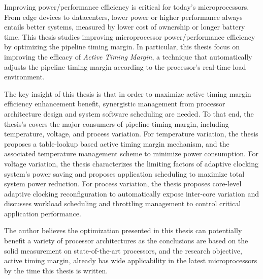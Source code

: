 
%
\utabstract
\indent

Improving power/performance efficiency is critical for today's microprocessors. From edge devices to datacenters, lower power or higher performance always entails better systems, measured by lower cost of ownership or longer battery time. This thesis studies improving microprocessor power/performance efficiency by optimizing the pipeline timing margin. In particular, this thesis focus on improving the efficacy of \textit{Active Timing Margin}, a technique that automatically adjusts the pipeline timing margin according to the processor's real-time load environment. 

The key insight of this thesis is that in order to maximize active timing margin efficiency enhancement benefit, synergistic management from processor architecture design and system software scheduling are needed. To that end, the thesis's covers the major consumers of pipeline timing margin, including temperature, voltage, and process variation. For temperature variation, the thesis proposes a table-lookup based active timing margin mechanism, and the associated temperature management scheme to minimize power consumption. For voltage variation, the thesis characterizes the limiting factors of adaptive clocking system's power saving and proposes application scheduling to maximize total system power reduction. For process variation, the thesis proposes core-level adaptive clocking reconfiguration to automatically expose inter-core variation and discusses workload scheduling and throttling management to control critical application performance. 

The author believes the optimization presented in this thesis can potentially benefit a variety of processor architectures as the conclusions are based on the solid measurement on state-of-the-art processors, and the research objective, active timing margin, already has wide applicability in the latest microprocessors by the time this thesis is written.



